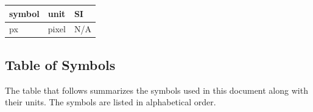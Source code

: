 \documentclass[12pt]{article}
\begin{document}

\renewcommand{\arraystretch}{1.2}
  \noindent \begin{tabular}{l l l} 
    \toprule		
    \textbf{symbol} & \textbf{unit} & \textbf{SI}\\
    \midrule 
    px & pixel & N/A \\
    \bottomrule
  \end{tabular}




\subsection{Table of Symbols}

The table that follows summarizes the symbols used in this document along with
their units. The symbols are listed in alphabetical order.
\end{document}
